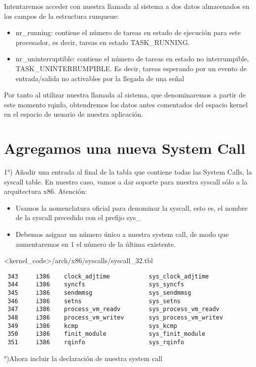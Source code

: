 Intentaremos acceder con nuestra llamada al sistema a dos datos almacenados en los campos de la estructura runqueue:
\begin{itemize}  
\item nr\_running: contiene el número de tareas en estado de ejecución para este procesador, es decir, tareas en estado TASK\_RUNNING.
\item nr\_uninterruptible: contiene el número de tareas en estado no interrumpible, 
 TASK\_UNINTERRUMPIBLE.
 Es decir, tareas esperando por un evento de entrada/salida no activables por la llegada de una señal
\end{itemize}

Por tanto al utilizar nuestra llamada al sistema, que denominaremos a partir de este momento rqinfo, obtendremos los datos antes comentados del espacio kernel en el espacio de usuario de nuestra aplicación.

\section{Agregamos una nueva System Call}
1°) Añadir una entrada al final de la tabla que contiene todas las System Calls, la syscall table. En nuestro caso, vamos a dar soporte para nuestra syscall sólo a la arquitectura x86. 
Atención: 
\begin{itemize}  
\item Usamos la nomenclatura oficial para denominar la syscall, esto es, el nombre de la syscall precedido con el prefijo sys\_
\item Debemos asignar un número único a nuestra system call, de modo que aumentaremos en 1 el número de la última existente.
\end{itemize}

<kernel\_code>/arch/x86/syscalls/syscall\_32.tbl
\begin{verbatim}
 343     i386    clock_adjtime           sys_clock_adjtime               
 344     i386    syncfs                  sys_syncfs
 345     i386    sendmmsg                sys_sendmmsg                    
 346     i386    setns                   sys_setns
 347     i386    process_vm_readv        sys_process_vm_readv            
 348     i386    process_vm_writev       sys_process_vm_writev           
 349     i386    kcmp                    sys_kcmp
 350     i386    finit_module            sys_finit_module
 351     i386    rqinfo                  sys_rqinfo
\end{verbatim}

°)Ahora incluir la declaración de nuestra system call


